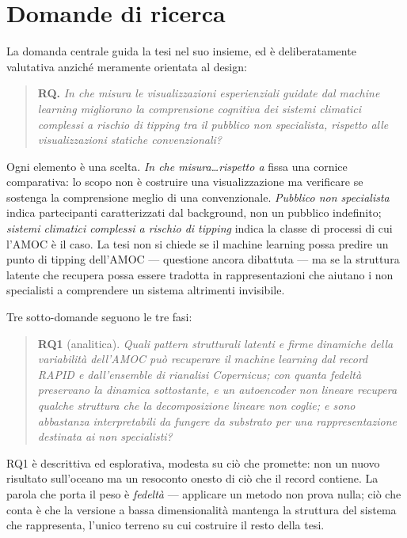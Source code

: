 \section{Domande di ricerca}
\label{sec:rqs}

La domanda centrale guida la tesi nel suo insieme, ed è deliberatamente valutativa anziché meramente orientata al design:

\begin{quote}
\textbf{RQ.} \emph{In che misura le visualizzazioni esperienziali guidate dal machine learning migliorano la comprensione cognitiva dei sistemi climatici complessi a rischio di tipping tra il pubblico non specialista, rispetto alle visualizzazioni statiche convenzionali?}
\end{quote}

Ogni elemento è una scelta. \emph{In che misura\ldots rispetto a} fissa una cornice comparativa: lo scopo non è costruire una visualizzazione ma verificare se sostenga la comprensione meglio di una convenzionale. \emph{Pubblico non specialista} indica partecipanti caratterizzati dal background, non un pubblico indefinito; \emph{sistemi climatici complessi a rischio di tipping} indica la classe di processi di cui l'AMOC è il caso. La tesi non si chiede se il machine learning possa predire un punto di tipping dell'AMOC --- questione ancora dibattuta \citep{benyami2024, ditlevsen2023} --- ma se la struttura latente che recupera possa essere tradotta in rappresentazioni che aiutano i non specialisti a comprendere un sistema altrimenti invisibile.

Tre sotto-domande seguono le tre fasi:

\begin{quote}
\textbf{RQ1} (analitica). \emph{Quali pattern strutturali latenti e firme dinamiche della variabilità dell'AMOC può recuperare il machine learning dal record RAPID e dall'ensemble di rianalisi Copernicus; con quanta fedeltà preservano la dinamica sottostante, e un autoencoder non lineare recupera qualche struttura che la decomposizione lineare non coglie; e sono abbastanza interpretabili da fungere da substrato per una rappresentazione destinata ai non specialisti?}
\end{quote}

RQ1 è descrittiva ed esplorativa, modesta su ciò che promette: non un nuovo risultato sull'oceano ma un resoconto onesto di ciò che il record contiene. La parola che porta il peso è \emph{fedeltà} --- applicare un metodo non prova nulla; ciò che conta è che la versione a bassa dimensionalità mantenga la struttura del sistema che rappresenta, l'unico terreno su cui costruire il resto della tesi.

